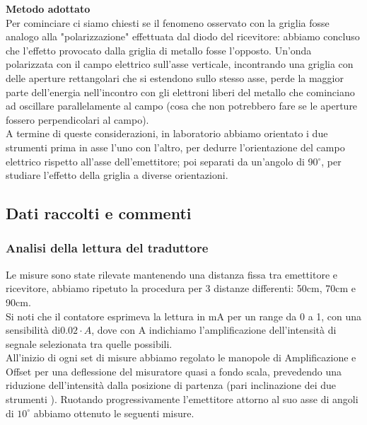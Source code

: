 \documentclass{article}
\theoremstyle{definition}
\begin{document}
\noindent \textbf{Metodo adottato}\\

\noindent Per cominciare ci siamo chiesti se il fenomeno osservato con la griglia fosse analogo alla  "polarizzazione" effettuata dal diodo del ricevitore: abbiamo concluso che l'effetto provocato dalla griglia di metallo fosse l'opposto. Un'onda polarizzata con il campo elettrico sull'asse verticale, incontrando una griglia con delle aperture rettangolari che si estendono sullo stesso asse, perde la maggior parte dell'energia nell'incontro con gli elettroni liberi del metallo che cominciano ad oscillare parallelamente al campo (cosa che non potrebbero fare se le aperture fossero perpendicolari al campo).\\
A termine di queste considerazioni, in laboratorio abbiamo orientato i due strumenti prima in asse l'uno con l'altro, per dedurre l'orientazione del campo elettrico rispetto all'asse dell'emettitore; poi separati da un'angolo di 90\(^{\circ}\), per studiare l'effetto della griglia a diverse orientazioni. 



\subsection{Dati raccolti e commenti}

\subsubsection{Analisi della lettura del traduttore}
Le misure sono state rilevate mantenendo una distanza fissa tra emettitore e ricevitore, abbiamo ripetuto la procedura per 3 distanze differenti: 50cm, 70cm e 90cm.\\
Si noti che il contatore esprimeva la lettura in mA per un range da 0 a 1, con una sensibilità di\( 0.02 \cdot A\), dove con A indichiamo l'amplificazione dell'intensità di segnale selezionata tra quelle possibili.\\
All'inizio di ogni set di misure abbiamo regolato le manopole di Amplificazione e Offset per una deflessione del misuratore quasi a fondo scala, prevedendo una riduzione dell'intensità dalla posizione di partenza (pari inclinazione dei due strumenti ).
Ruotando progressivamente l'emettitore attorno al suo asse di angoli di \(10^{\circ}\) abbiamo ottenuto le seguenti misure.\\
\end{document}
